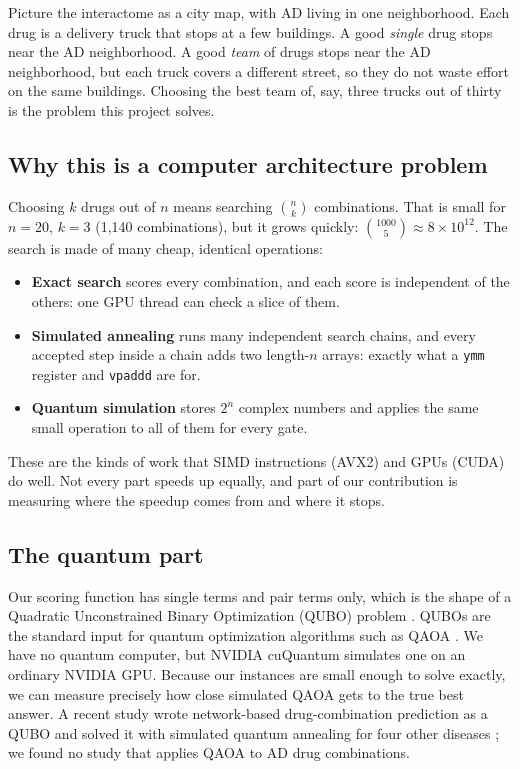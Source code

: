 \begin{plainwords}
Picture the interactome as a city map, with AD living in one neighborhood. Each drug is a delivery truck that stops at a few buildings. A good \emph{single} drug stops near the AD neighborhood. A good \emph{team} of drugs stops near the AD neighborhood, but each truck covers a different street, so they do not waste effort on the same buildings. Choosing the best team of, say, three trucks out of thirty is the problem this project solves.
\end{plainwords}

\subsection{Why this is a computer architecture problem}

Choosing $k$ drugs out of $n$ means searching $\binom{n}{k}$ combinations. That is small for $n=20$, $k=3$ (1{,}140 combinations), but it grows quickly: $\binom{1000}{5}\approx 8\times 10^{12}$. The search is made of many cheap, identical operations:
\begin{itemize}
\item \textbf{Exact search} scores every combination, and each score is independent of the others: one GPU thread can check a slice of them.
\item \textbf{Simulated annealing} runs many independent search chains, and every accepted step inside a chain adds two length-$n$ arrays: exactly what a \texttt{ymm} register and \texttt{vpaddd} are for.
\item \textbf{Quantum simulation} stores $2^n$ complex numbers and applies the same small operation to all of them for every gate.
\end{itemize}
These are the kinds of work that SIMD instructions (AVX2) and GPUs (CUDA) do well. Not every part speeds up equally, and part of our contribution is measuring where the speedup comes from and where it stops.

\subsection{The quantum part}

Our scoring function has single terms and pair terms only, which is the shape of a Quadratic Unconstrained Binary Optimization (QUBO) problem \cite{glover2019tutorial,lucas2014ising}. QUBOs are the standard input for quantum optimization algorithms such as QAOA \cite{farhi2014qaoa}. We have no quantum computer, but NVIDIA cuQuantum \cite{bayraktar2023cuquantum} simulates one on an ordinary NVIDIA GPU. Because our instances are small enough to solve exactly, we can measure precisely how close simulated QAOA gets to the true best answer. A recent study wrote network-based drug-combination prediction as a QUBO and solved it with simulated quantum annealing for four other diseases \cite{ramos2025quantum}; we found no study that applies QAOA to AD drug combinations.

